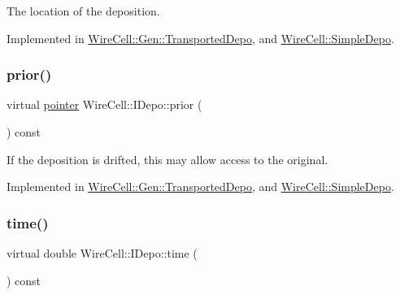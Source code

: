 The location of the deposition. 



Implemented in \hyperlink{class_wire_cell_1_1_gen_1_1_transported_depo_adc6089147221a0e27445f167969bd26d}{Wire\+Cell\+::\+Gen\+::\+Transported\+Depo}, and \hyperlink{class_wire_cell_1_1_simple_depo_ab41e2325f1fdff081ef6724389419529}{Wire\+Cell\+::\+Simple\+Depo}.

\mbox{\label{class_wire_cell_1_1_i_depo_a440532d005a463cc9df5731ddb96f601}} 
\subsubsection{\texorpdfstring{prior()}{prior()}}
{\footnotesize\ttfamily virtual \hyperlink{class_wire_cell_1_1_i_data_aff870b3ae8333cf9265941eef62498bc}{pointer} Wire\+Cell\+::\+I\+Depo\+::prior (\begin{DoxyParamCaption}{ }\end{DoxyParamCaption}) const\hspace{0.3cm}{\ttfamily [pure virtual]}}



If the deposition is drifted, this may allow access to the original. 



Implemented in \hyperlink{class_wire_cell_1_1_gen_1_1_transported_depo_af0a35d96f56e8039264cadd795535633}{Wire\+Cell\+::\+Gen\+::\+Transported\+Depo}, and \hyperlink{class_wire_cell_1_1_simple_depo_a23c734fee4ed0184b032e99a193f6f8e}{Wire\+Cell\+::\+Simple\+Depo}.

\mbox{\label{class_wire_cell_1_1_i_depo_abec395a8a8335d76ae07db2baf57ed83}} 
\subsubsection{\texorpdfstring{time()}{time()}}
{\footnotesize\ttfamily virtual double Wire\+Cell\+::\+I\+Depo\+::time (\begin{DoxyParamCaption}{ }\end{DoxyParamCaption}) const\hspace{0.3cm}{\ttfamily [pure virtual]}}

